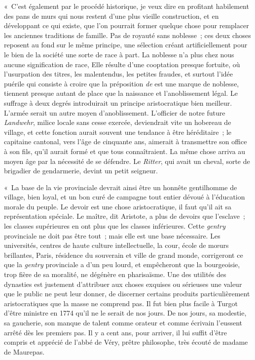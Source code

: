 \documentclass[french,twoside]{book} %
\newenvironment{quoteblock}%
  {\begin{quoting}}
  {\end{quoting}}
\newenvironment{quotebar}{%
    \def\FrameCommand{{\color{rubric!10!}\vrule width 0.5em} \hspace{0.9em}}%
    \def\OuterFrameSep{\itemsep} %
    \MakeFramed {\advance\hsize-\width \FrameRestore}
  }%
  {%
    \endMakeFramed
  }
\renewenvironment{quoteblock}%
  {%
    \savenotes
    \setstretch{0.9}
    \normalfont
    \begin{quotebar}
  }
  {%
    \end{quotebar}
    \spewnotes
  }
\begin{document}
\begin{quoteblock}
 « C’est également par le procédé historique, je veux dire en profitant habilement des pans de murs qui nous restent d’une plus vieille construction, et en développant ce qui existe, que l’on pourrait former quelque chose pour remplacer les anciennes traditions de famille. Pas de royauté sans noblesse ; ces deux choses reposent au fond sur le même principe, une sélection créant artificiellement pour le bien de la société une sorte de race à part. La noblesse n’a plus chez nous aucune signification de race, Elle résulte d’une cooptation presque fortuite, où l’usurpation des titres, les malentendus, les petites fraudes, et surtout l’idée puérile qui consiste à croire que la préposition {\itshape de} est une marque de noblesse, tiennent presque autant de place que la naissance et l’anoblissement légal. Le suffrage à deux degrés introduirait un principe aristocratique bien meilleur. L’armée serait un autre moyen d’anoblissement. L’officier de notre future {\itshape Landwehr}, milice locale sans cesse exercée, deviendrait vite un hobereau de village, et cette fonction aurait souvent une tendance à être héréditaire ; le capitaine cantonal, vers l’âge de cinquante ans, aimerait à transmettre son office à son fils, qu’il aurait formé et que tous connaîtraient. La même chose arriva au moyen âge par la nécessité de se défendre. Le {\itshape Ritter}, qui avait un cheval, sorte de brigadier de gendarmerie, devint un petit seigneur.\par
 « La base de la vie provinciale devrait ainsi être un honnête gentilhomme de village, bien loyal, et un bon curé de campagne tout entier dévoué à l’éducation morale du peuple. Le devoir est une chose aristocratique, il faut qu’il ait sa représentation spéciale. Le maître, dit Aristote, a plus de devoirs que l’esclave ; les classes supérieures en ont plus que les classes inférieures. Cette {\itshape gentry} provinciale ne doit pas être tout ; mais elle est une base nécessaire. Les universités, centres de haute culture intellectuelle, la cour, école de mœurs brillantes, Paris, résidence du souverain et ville de grand monde, corrigeront ce que la {\itshape gentry} provinciale a d’un peu lourd, et empêcheront que la bourgeoisie, trop fière de sa moralité, ne dégénère en pharisaïsme. Une des utilités des dynasties est justement d’attribuer aux choses exquises ou sérieuses une valeur que le public ne peut leur donner, de discerner certains produits particulièrement aristocratiques que la masse ne comprend pas. Il fut bien plus facile à Turgot d’être ministre en 1774 qu’il ne le serait de nos jours. De nos jours, sa modestie, sa gaucherie, son manque de talent comme orateur et comme écrivain l’eussent arrêté dès les premiers pas. Il y a cent ans, pour arriver, il lui suffit d’être compris et apprécié de l’abbé de Véry, prêtre philosophe, très écouté de madame de Maurepas.\par

\end{quoteblock}
\end{document}
